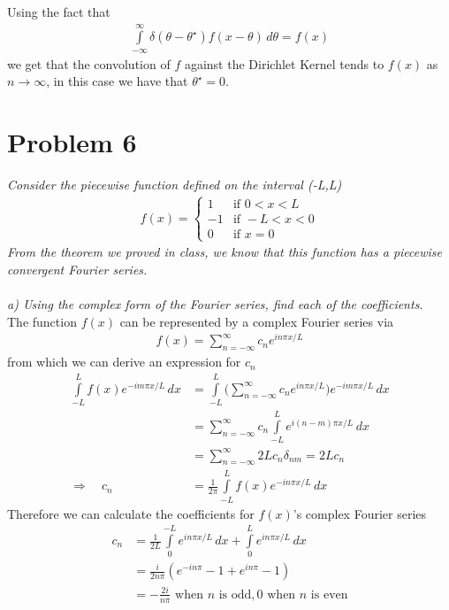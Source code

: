 \documentclass[12pt]{article}
\theoremstyle{remark}
\begin{document}
Using the fact that 
\begin{align*}
\int\limits_{-\infty}^\infty \delta(\theta - \theta^\star)f(x - \theta) \, d\theta = f(x)
\end{align*}
we get that the convolution of $f$ against the Dirichlet Kernel tends to $f(x)$ as $n \rightarrow \infty$, in this case we have that $\theta^\star = 0$.

\newpage

\section*{Problem 6}

\textit{Consider the piecewise function defined on the interval (-L,L)}
\begin{align}
	f(x) = 
	\begin{cases}
	1 & \text{if } 0 < x < L \\
	-1 & \text{if } -L < x < 0 \\
	0 & \text{if } x = 0
	\end{cases}
\end{align}
\textit{From the theorem we proved in class, we know that this function has a piecewise convergent Fourier series.} \\ \\
\textit{a) Using the complex form of the Fourier series, find each of the coefficients.} \\ 

The function $f(x)$ can be represented by a complex Fourier series via
\begin{align*}
	f(x) = \sum\limits_{n=-\infty}^\infty c_ne^{in\pi x/L}
\end{align*}
from which we can derive an expression for $c_n$ 
\begin{align*}
	\int\limits_{-L}^{L} f(x) e^{-im\pi x/L} \, dx  & = \int\limits_{-L}^{L} \bigg( \sum\limits_{n=-\infty}^\infty c_ne^{in\pi x/L} \bigg)e^{-im\pi x/L} \, dx \\
	& = \sum\limits_{n=-\infty}^\infty c_n \int\limits_{-L}^L e^{i(n-m)\pi x/L} \, dx \\
	& = \sum\limits_{n=-\infty}^\infty 2L c_n\delta_{nm} = 2L c_n \\
	\Rightarrow \quad c_n & = \frac{1}{2\pi}\int\limits_{-L}^L f(x)e^{-in\pi x/L} \, dx
\end{align*}
Therefore we can calculate the coefficients for $f(x)$'s complex Fourier series
\begin{align*}
	c_n & = \frac{1}{2L}\int\limits_{0}^{-L} e^{in\pi x/L} \, dx + \int\limits_0^L e^{in\pi x/L} \, dx \\
	& = \frac{i}{2n\pi}(e^{-in\pi} - 1 + e^{in\pi} - 1) \\
	& = -\frac{2i}{n\pi} \text{ when $n$ is odd}, 0 \text{ when $n$ is even}
\end{align*}
\end{document}
